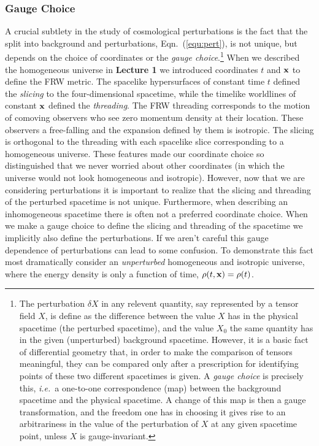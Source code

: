 \documentclass[12pt,letterpaper,rotate]{article}
\begin{document}
{\subsubsection{Gauge Choice}
A crucial subtlety in the study of cosmological perturbations is the fact that the split into background and perturbations, Eqn.~(\ref{equ:pert}), is not unique, but depends on the choice of coordinates or the {\it gauge choice}.\footnote{The perturbation $\delta X$ in any relevent quantity, say represented by a tensor field $X$, is define as the difference between the value $X$ has in the physical spacetime (the perturbed spacetime), and the value $X_0$ the same quantity has in the given (unperturbed) background spacetime. However, it is a basic fact of differential geometry that, in order to make the comparison of tensors meaningful, they can be compared only after a prescription for identifying points of these two different spacetimes is given. A {\it gauge choice} is precisely this, {\it i.e.}~a one-to-one correspondence (map) between the background spacetime and the physical spacetime. A change of this map is then a gauge transformation, and the freedom one has in choosing it gives rise to an arbitrariness in the value of the perturbation of $X$ at any given spacetime point, unless $X$ is gauge-invariant.}
When we described the homogeneous universe in {\bf Lecture 1} we introduced coordinates $t$ and ${\bf x}$ to define the FRW metric.
The spacelike hypersurfaces of constant time $t$ defined the {\it slicing} to the four-dimensional spacetime,
while the timelike worldlines of constant ${\bf x}$ defined the {\it threading}.
The FRW threading corresponds to the motion of comoving observers who see zero momentum density at their location. These observers a free-falling and the expansion defined by them is isotropic. The slicing is orthogonal to the threading with each spacelike slice corresponding to a homogeneous universe.
These features made our coordinate choice so distinguished that we never worried about other coordinates (in which the universe would not look homogeneous and isotropic).
However, now that we are considering perturbations it is important to realize that the
slicing and threading
of the perturbed spacetime is not unique. Furthermore, when describing an inhomogeneous spacetime there is often not a preferred coordinate choice.
When we make a gauge choice to define the slicing and threading of the spacetime we implicitly also define the perturbations.
If we aren't careful this gauge dependence of perturbations can lead to some confusion.
To demonstrate this fact most dramatically consider an {\it unperturbed} homogeneous and isotropic universe, where the energy density is only a function of time, $\rho(t, {\bf x})= \rho(t)$.
}
\end{document}
